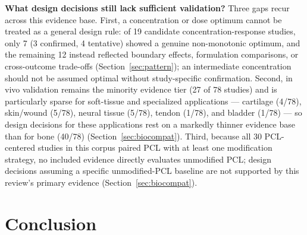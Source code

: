 \documentclass[5p,times,twocolumn]{elsarticle}
\begin{document}
\textbf{What design decisions still lack sufficient validation?} Three gaps recur across this evidence base. First, a concentration or dose optimum cannot be treated as a general design rule: of 19 candidate concentration-response studies, only 7 (3 confirmed, 4 tentative) showed a genuine non-monotonic optimum, and the remaining 12 instead reflected boundary effects, formulation comparisons, or cross-outcome trade-offs (Section~\ref{sec:pattern}); an intermediate concentration should not be assumed optimal without study-specific confirmation. Second, in vivo validation remains the minority evidence tier (27 of 78 studies) and is particularly sparse for soft-tissue and specialized applications --- cartilage (4/78), skin/wound (5/78), neural tissue (5/78), tendon (1/78), and bladder (1/78) --- so design decisions for these applications rest on a markedly thinner evidence base than for bone (40/78) (Section~\ref{sec:biocompat}). Third, because all 30 PCL-centered studies in this corpus paired PCL with at least one modification strategy, no included evidence directly evaluates unmodified PCL; design decisions assuming a specific unmodified-PCL baseline are not supported by this review's primary evidence (Section~\ref{sec:biocompat}).

\section{Conclusion}
\end{document}
